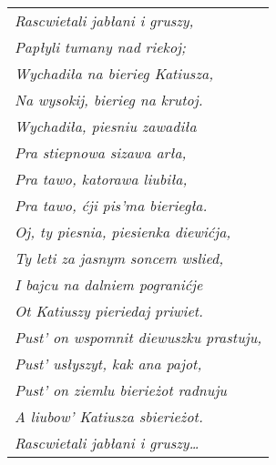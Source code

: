 {\small 
	\begin{tabular}{l}
		\textit{Rascwietali jabłani i gruszy,} \\
		\textit{Papłyli tumany nad riekoj; }\\
		\textit{Wychadiła na bierieg Katiusza,} \\
		\textit{Na wysokij, bierieg na krutoj.} \\[1mm]
		
		\textit{Wychadiła, piesniu zawadiła} \\
		\textit{Pra stiepnowa sizawa arła,} \\
		\textit{Pra tawo, katorawa liubiła,} \\
		\textit{Pra tawo, ćji pis'ma bieriegła.} \\[1mm]
		
		\textit{Oj, ty piesnia, piesienka diewićja,} \\
		\textit{Ty leti za jasnym soncem wslied,} \\
		\textit{I bajcu na dalniem pogranićje} \\
		\textit{Ot Katiuszy pieriedaj priwiet.} \\[1mm]
		
		\textit{Pust' on wspomnit diewuszku prastuju,} \\
		\textit{Pust' usłyszyt, kak ana pajot,} \\
		\textit{Pust' on ziemlu bierieżot radnuju} \\
		\textit{A liubow' Katiusza sbierieżot.} \\[1mm]
		
		\textit{Rascwietali jabłani i gruszy\ldots} \\
		
	\end{tabular}

 }